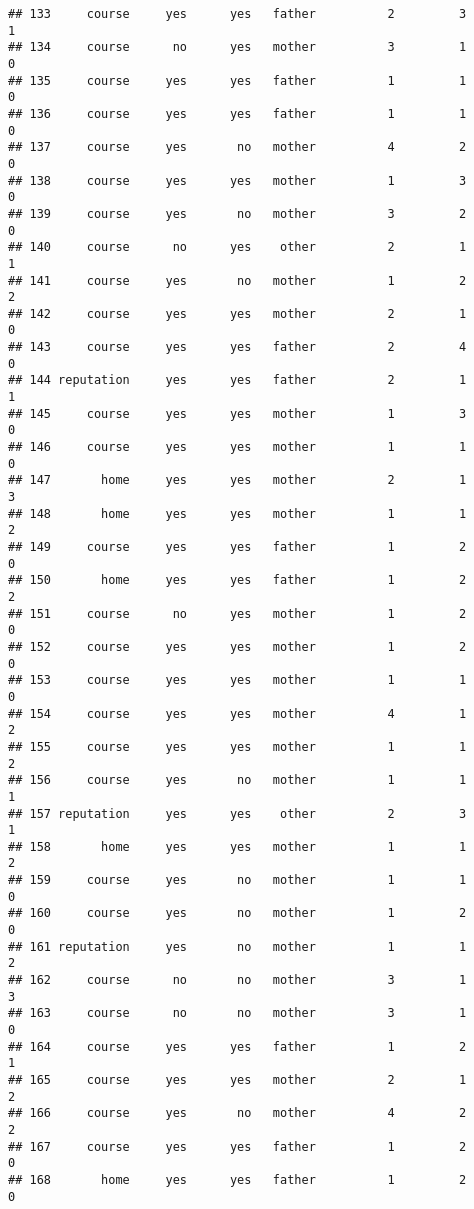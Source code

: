 \documentclass[]{article}
\begin{document}
\begin{verbatim}
## 133     course     yes      yes   father          2         3        1
## 134     course      no      yes   mother          3         1        0
## 135     course     yes      yes   father          1         1        0
## 136     course     yes      yes   father          1         1        0
## 137     course     yes       no   mother          4         2        0
## 138     course     yes      yes   mother          1         3        0
## 139     course     yes       no   mother          3         2        0
## 140     course      no      yes    other          2         1        1
## 141     course     yes       no   mother          1         2        2
## 142     course     yes      yes   mother          2         1        0
## 143     course     yes      yes   father          2         4        0
## 144 reputation     yes      yes   father          2         1        1
## 145     course     yes      yes   mother          1         3        0
## 146     course     yes      yes   mother          1         1        0
## 147       home     yes      yes   mother          2         1        3
## 148       home     yes      yes   mother          1         1        2
## 149     course     yes      yes   father          1         2        0
## 150       home     yes      yes   father          1         2        2
## 151     course      no      yes   mother          1         2        0
## 152     course     yes      yes   mother          1         2        0
## 153     course     yes      yes   mother          1         1        0
## 154     course     yes      yes   mother          4         1        2
## 155     course     yes      yes   mother          1         1        2
## 156     course     yes       no   mother          1         1        1
## 157 reputation     yes      yes    other          2         3        1
## 158       home     yes      yes   mother          1         1        2
## 159     course     yes       no   mother          1         1        0
## 160     course     yes       no   mother          1         2        0
## 161 reputation     yes       no   mother          1         1        2
## 162     course      no       no   mother          3         1        3
## 163     course      no       no   mother          3         1        0
## 164     course     yes      yes   father          1         2        1
## 165     course     yes      yes   mother          2         1        2
## 166     course     yes       no   mother          4         2        2
## 167     course     yes      yes   father          1         2        0
## 168       home     yes      yes   father          1         2        0

\end{verbatim}
\end{document}
